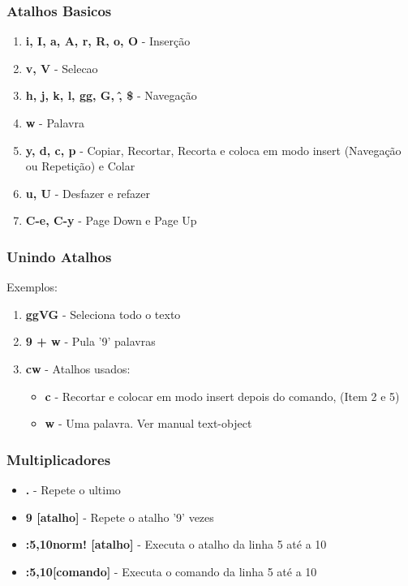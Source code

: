 \documentclass[aspectratio=169]{beamer}
\begin{document}
\begin{frame}\frametitle{Atalhos Basicos}
    \begin{enumerate}
        \item <1-> \textbf{i, I, a, A, r, R, o, O} - Inserção
        \item <2-> \textbf{v, V} - Selecao
        \item <3-> \textbf{h, j, k, l, gg, G, \^, \$} - Navegação
        \item <4-> \textbf{w} - Palavra
        \item <5-> \textbf{y, d, c, p} - Copiar, Recortar, Recorta e coloca em modo insert (Navegação ou Repetição) e Colar
        \item <6-> \textbf{u, U} - Desfazer e refazer
        \item <7-> \textbf{C-e, C-y} - Page Down e Page Up
    \end{enumerate}
\end{frame}

\begin{frame}\frametitle{Unindo Atalhos}
    Exemplos:
    \begin{enumerate}
        \item <1-> \textbf{ggVG} - Seleciona todo o texto
        \item <2-> \textbf{9 + w} - Pula '9' palavras
        \item <3-> \textbf{cw} - Atalhos usados:
            \begin{itemize}
                \item \textbf{c} - Recortar e colocar em modo insert depois do comando, (Item 2 e 5)
                \item \textbf{w} - Uma palavra. Ver manual text-object
            \end{itemize}
    \end{enumerate}
\end{frame}

\begin{frame}\frametitle{Multiplicadores}
    \begin{itemize}
        \item <1-> \textbf{.} - Repete o ultimo
        \item <2-> \textbf{9 [atalho]} - Repete o atalho '9' vezes
        \item <3-> \textbf{:5,10norm! [atalho]} - Executa o atalho da linha 5 até a 10
        \item <4-> \textbf{:5,10[comando]} - Executa o comando da linha 5 até a 10
    \end{itemize}
\end{frame}
\end{document}
